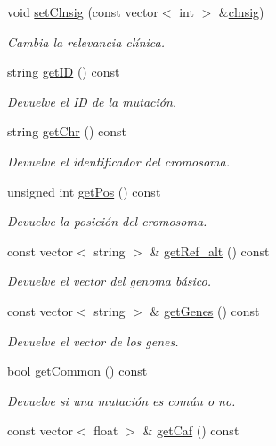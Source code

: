 \begin{DoxyCompactItemize}
void \hyperlink{classmutacion_ad69eed035c3c25f23bc587d9e6f99c05}{set\+Clnsig} (const vector$<$ int $>$ \&\hyperlink{classmutacion_adc0290c4a6db7f4c7341b0183c7ef534}{clnsig})
\begin{DoxyCompactList}\small\item\em Cambia la relevancia clínica. \end{DoxyCompactList}\item 
string \hyperlink{classmutacion_a81a090846e289f5b04cca22df458fbd2}{get\+ID} () const
\begin{DoxyCompactList}\small\item\em Devuelve el ID de la mutación. \end{DoxyCompactList}\item 
string \hyperlink{classmutacion_a08cafaefc6dc2c49424c414dad7e823a}{get\+Chr} () const
\begin{DoxyCompactList}\small\item\em Devuelve el identificador del cromosoma. \end{DoxyCompactList}\item 
unsigned int \hyperlink{classmutacion_ab11e8cb7dc7b07befe3ec4f7c48ee941}{get\+Pos} () const
\begin{DoxyCompactList}\small\item\em Devuelve la posición del cromosoma. \end{DoxyCompactList}\item 
const vector$<$ string $>$ \& \hyperlink{classmutacion_a7ca5dbd9bbf12a7d581bffca550692cb}{get\+Ref\+\_\+alt} () const
\begin{DoxyCompactList}\small\item\em Devuelve el vector del genoma básico. \end{DoxyCompactList}\item 
const vector$<$ string $>$ \& \hyperlink{classmutacion_ac5e49b51d205e1de51ea8a4e405405c1}{get\+Genes} () const
\begin{DoxyCompactList}\small\item\em Devuelve el vector de los genes. \end{DoxyCompactList}\item 
bool \hyperlink{classmutacion_a8aef0548762119d1a4c0109477b3f182}{get\+Common} () const
\begin{DoxyCompactList}\small\item\em Devuelve si una mutación es común o no. \end{DoxyCompactList}\item 
const vector$<$ float $>$ \& \hyperlink{classmutacion_a51b13ad53a652970d7983d4c21e9e73b}{get\+Caf} () const

\end{DoxyCompactItemize}
